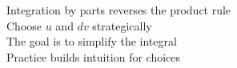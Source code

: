 \documentclass[preview]{standalone}
\begin{document}
Integration by parts reverses the product rule\\Choose $u$ and $dv$ strategically\\The goal is to simplify the integral\\Practice builds intuition for choices\\
\end{document}
